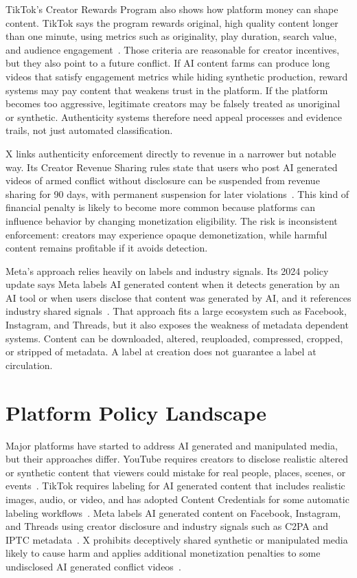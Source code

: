 \documentclass[11pt]{article}
\begin{document}
TikTok's Creator Rewards Program also shows how platform money can shape content. TikTok says the program rewards original, high quality content longer than one minute, using metrics such as originality, play duration, search value, and audience engagement~\cite{tiktokRewards2024}. Those criteria are reasonable for creator incentives, but they also point to a future conflict. If AI content farms can produce long videos that satisfy engagement metrics while hiding synthetic production, reward systems may pay content that weakens trust in the platform. If the platform becomes too aggressive, legitimate creators may be falsely treated as unoriginal or synthetic. Authenticity systems therefore need appeal processes and evidence trails, not just automated classification.

X links authenticity enforcement directly to revenue in a narrower but notable way. Its Creator Revenue Sharing rules state that users who post AI generated videos of armed conflict without disclosure can be suspended from revenue sharing for 90 days, with permanent suspension for later violations~\cite{xRevenue2026}. This kind of financial penalty is likely to become more common because platforms can influence behavior by changing monetization eligibility. The risk is inconsistent enforcement: creators may experience opaque demonetization, while harmful content remains profitable if it avoids detection.

Meta's approach relies heavily on labels and industry signals. Its 2024 policy update says Meta labels AI generated content when it detects generation by an AI tool or when users disclose that content was generated by AI, and it references industry shared signals~\cite{meta2024labeling}. That approach fits a large ecosystem such as Facebook, Instagram, and Threads, but it also exposes the weakness of metadata dependent systems. Content can be downloaded, altered, reuploaded, compressed, cropped, or stripped of metadata. A label at creation does not guarantee a label at circulation.

\section{Platform Policy Landscape}

Major platforms have started to address AI generated and manipulated media, but their approaches differ. YouTube requires creators to disclose realistic altered or synthetic content that viewers could mistake for real people, places, scenes, or events~\cite{youtubeHelpSynthetic}. TikTok requires labeling for AI generated content that includes realistic images, audio, or video, and has adopted Content Credentials for some automatic labeling workflows~\cite{tiktok2023labels,tiktok2024credentials}. Meta labels AI generated content on Facebook, Instagram, and Threads using creator disclosure and industry signals such as C2PA and IPTC metadata~\cite{meta2024labeling}. X prohibits deceptively shared synthetic or manipulated media likely to cause harm and applies additional monetization penalties to some undisclosed AI generated conflict videos~\cite{xRules2026,xRevenue2026}.
\end{document}
